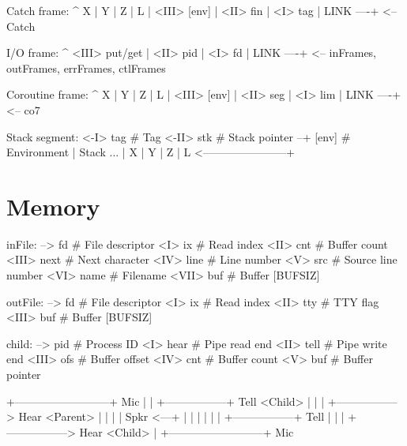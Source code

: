 \begin{wideverbatim}


Catch frame:
                  ^
         X        |
         Y        |
         Z        |
         L        |
   <III> [env]    |
   <II>  fin      |
   <I>   tag      |
         LINK ----+  <-- Catch


I/O frame:
                  ^
   <III> put/get  |
   <II>  pid      |
   <I>   fd       |
         LINK ----+  <-- inFrames, outFrames, errFrames, ctlFrames


Coroutine frame:
                  ^
         X        |
         Y        |
         Z        |
         L        |
   <III> [env]    |
   <II>  seg      |
   <I>   lim      |
         LINK ----+  <-- co7


Stack segment:
   <-I>  tag      # Tag
   <-II> stk      # Stack pointer --+
         [env]    # Environment     |
         Stack ...                  |
         X                          |
         Y                          |
         Z                          |
         L  <-----------------------+


\end{wideverbatim}

\section{Memory}
\label{sec:internal-structures-memory}

\begin{wideverbatim}
inFile:
   -->   fd       # File descriptor
   <I>   ix       # Read index
   <II>  cnt      # Buffer count
   <III> next     # Next character
   <IV>  line     # Line number
   <V>   src      # Source line number
   <VI>  name     # Filename
   <VII> buf      # Buffer [BUFSIZ]

outFile:
   -->   fd       # File descriptor
   <I>   ix       # Read index
   <II>  tty      # TTY flag
   <III> buf      # Buffer [BUFSIZ]


child:
   -->   pid      # Process ID
   <I>   hear     # Pipe read end
   <II>  tell     # Pipe write end
   <III> ofs      # Buffer offset
   <IV>  cnt      # Buffer count
   <V>   buf      # Buffer pointer

            +--------------------------+ Mic
            |
            |  +-----------------+ Tell         <Child>
            |  |
            |  +-----------------> Hear
<Parent>    |  |
            |  |
   Spkr <---+  |
            |  |
            |  |
            |  +-----------------+ Tell
            |  |
            |  +-----------------> Hear         <Child>
            |
            +--------------------------+ Mic


\end{wideverbatim}

